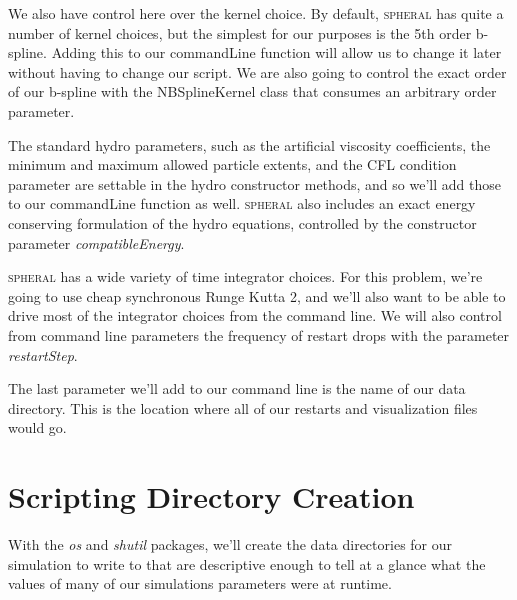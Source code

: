 \documentclass[11pt]{memoir}
\begin{document}
We also have control here over the kernel choice. 
By default, \textsc{spheral} has quite a number of kernel choices, but the simplest for our purposes is the 5th order b-spline. 
Adding this to our commandLine function will allow us to change it later without having to change our script. 
We are also going to control the exact order of our b-spline with the NBSplineKernel class that consumes an arbitrary order parameter.



The standard hydro parameters, such as the artificial viscosity coefficients, the minimum and maximum allowed particle extents, and the CFL condition parameter are settable in the hydro constructor methods, and so we'll add those to our commandLine function as well. 
\textsc{spheral} also includes an exact energy conserving formulation of the hydro equations, controlled by the constructor parameter \textit{compatibleEnergy}.



\textsc{spheral} has a wide variety of time integrator choices. 
For this problem, we're going to use cheap synchronous Runge Kutta 2, and we'll also want to be able to drive most of the integrator choices from the command line. 
We will also control from command line parameters the frequency of restart drops with the parameter \textit{restartStep}.



The last parameter we'll add to our command line is the name of our data directory. 
This is the location where all of our restarts and visualization files would go.



\section{Scripting Directory Creation}

With the \textit{os} and \textit{shutil} packages, we'll create the data directories for our simulation to write to that are descriptive enough to tell at a glance what the values of many of our simulations parameters were at runtime.


\end{document}
